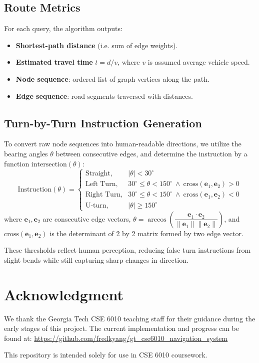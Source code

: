 \documentclass[fleqn,10pt]{olplainarticle}
\begin{document}
\subsection*{Route Metrics}
For each query, the algorithm outputs:
\begin{itemize}
    \item \textbf{Shortest-path distance} (i.e. sum of edge weights).
    \item \textbf{Estimated travel time} $t = d/v$, where $v$ is assumed average vehicle speed.
    \item \textbf{Node sequence}: ordered list of graph vertices along the path.
    \item \textbf{Edge sequence}: road segments traversed with distances.
\end{itemize}

\subsection*{Turn-by-Turn Instruction Generation}

To convert raw node sequences into human-readable directions, we utilize the bearing angles $\theta$ between consecutive edges, and determine the instruction by a function $\text{intersection}(\theta)$:
\[
\text{Instruction}(\theta) =
\begin{cases}
\text{Straight}, & |\theta| < 30^\circ \\[6pt]
\text{Left Turn}, & 30^\circ \leq \theta < 150^\circ \ \wedge \ \text{cross}(\mathbf{e}_1,\mathbf{e}_2) > 0 \\[6pt]
\text{Right Turn}, & 30^\circ \leq \theta < 150^\circ \ \wedge \ \text{cross}(\mathbf{e}_1,\mathbf{e}_2) < 0 \\[6pt]
\text{U-turn}, & |\theta| \geq 150^\circ
\end{cases}
\]
where $\mathbf{e}_1, \mathbf{e}_2$ are consecutive edge vectors, $\theta = \arccos\!\left( \dfrac{\mathbf{e}_1 \cdot \mathbf{e}_2}{\|\mathbf{e}_1\|\|\mathbf{e}_2\|} \right)$, and $\text{cross}(\mathbf{e}_1,\mathbf{e}_2)$ is the determinant of 2 by 2 matrix formed by two edge vector. 

These thresholds reflect human perception, reducing false turn instructions from slight bends while still capturing sharp changes in direction.

\section*{Acknowledgment}
We thank the Georgia Tech CSE 6010 teaching staff for their guidance during the early stages of this project.  
The current implementation and progress can be found at:  
\url{https://github.com/fredkyang/gt_cse6010_navigation_system}

This repository is intended solely for use in CSE 6010 coursework.
\end{document}
